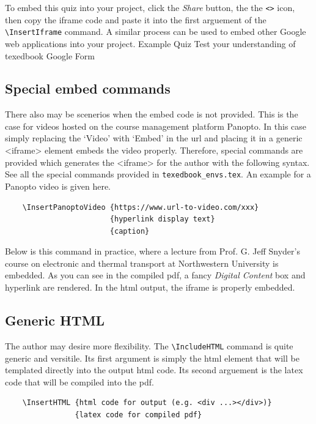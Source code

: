 \documentclass{article}
\begin{document}
To embed this quiz into your project, click the \textit{Share} button, the the \verb'<>' icon, then copy the iframe code and paste it into the first arguement of the \verb'\InsertIframe' command. A similar process can be used to embed other Google web applications into your project.
             {Example Quiz}
             {Test your understanding of texedbook}
             {Google Form}

\subsection{Special embed commands}
There also may be scenerios when the embed code is not provided. This is the case for videos hosted on the course management platform Panopto. In this case simply replacing the `Video' with `Embed' in the url and placing it in a generic <iframe> element embeds the video properly. Therefore, special commands are provided which generates the <iframe> for the author with the following syntax. See all the special commands provided in \verb'texedbook_envs.tex'. An example for a Panopto video is given here.
\begin{verbatim}
    \InsertPanoptoVideo {https://www.url-to-video.com/xxx}
                        {hyperlink display text}
                        {caption}
\end{verbatim}  

Below is this command in practice, where a lecture from Prof. G. Jeff Snyder's course on electronic and thermal transport at Northwestern University is embedded. As you can see in the compiled pdf, a fancy \textit{Digital Content} box and hyperlink are rendered. In the html output, the iframe is properly embedded.


\subsection{Generic HTML}
The author may desire more flexibility. The \verb'\IncludeHTML' command is quite generic and versitile. Its first argument is simply the html element that will be templated directly into the output html code. Its second arguement is the latex code that will be compiled into the pdf.   
\begin{verbatim}
    \InsertHTML {html code for output (e.g. <div ...></div>)}
                {latex code for compiled pdf}
\end{verbatim}  
\end{document}

